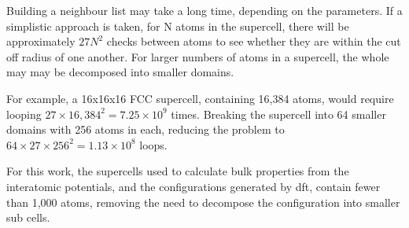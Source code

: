 Building a neighbour list may take a long time, depending on the parameters.  If a simplistic approach is taken, for N atoms in the supercell, there will be approximately $27N^2$ checks between atoms to see whether they are within the cut off radius of one another.  For larger numbers of atoms in a supercell, the whole may may be decomposed into smaller domains.

For example, a 16x16x16 FCC supercell, containing 16,384 atoms, would require looping $27 \times 16,384^2 = 7.25 \times 10^9$ times.  Breaking the supercell into 64 smaller domains with 256 atoms in each, reducing the problem to $64 \times 27 \times 256^2 = 1.13 \times 10^8$ loops.

For this work, the supercells used to calculate bulk properties from the interatomic potentials, and the configurations generated by \acrshort{dft}, contain fewer than 1,000 atoms, removing the need to decompose the configuration into smaller sub cells.


